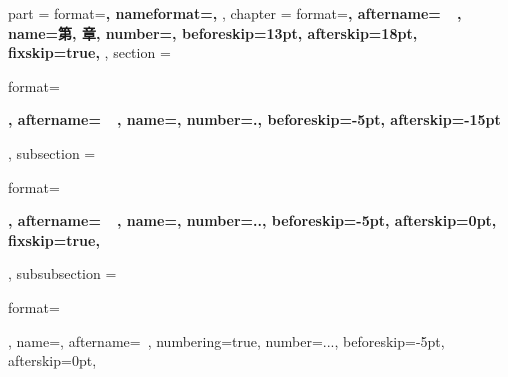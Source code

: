 {{        \renewcommand{\contentsname}    {目录}
        \renewcommand{\listfigurename}  {图目录}
        \renewcommand{\listtablename}   {表目录}
    }
    {
        \ctexset
        {
            part =
            {
                format=\centering{}\bfseries,
                nameformat=\centering\heiti\fontsize{48}{48}\bfseries,
            },
            chapter =
            {
                format=\centering{}\bfseries,
                aftername=~~,
                name={第, 章},
                number=,
                beforeskip=13pt,
                afterskip=18pt,
                fixskip=true,
            },
            section =
            {
                format=\raggedright{}\bfseries,
                aftername=~~,
                name={},
                number=.,
                beforeskip=-5pt,
                afterskip=-15pt
            },
            subsection =
            {
                format=\raggedright{}\bfseries,
                aftername=~~,
                name={},
                number=..,
                beforeskip=-5pt,
                afterskip=0pt,
                fixskip=true,
            },
            subsubsection =
            {
                format=\raggedright{},
                name={},
                aftername=~,
                numbering=true,
                number=...,
                beforeskip=-5pt,
                afterskip=0pt,
            }
        }

        \renewcommand{\chapternonum}[1]
        {
            \phantomsection
            \addcontentsline{toc}{chapter}{#1}
            \markboth{#1}{#1}
            \chapter*{\bfseries \heiti #1}
        }

        \renewcommand{\contentsname}    {目录}
        \renewcommand{\listfigurename}  {图目录}
        \renewcommand{\listtablename}   {表目录}
    }
}
{}

